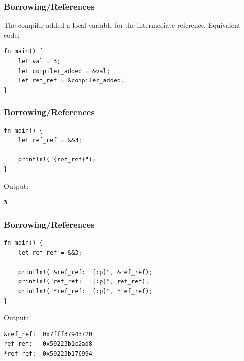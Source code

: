\begin{frame}[fragile]
    \frametitle{Borrowing/References}
    The compiler added a local variable for the intermediate reference.
    Equivalent code:
    \vfill
    \begin{verbatim}
fn main() {
    let val = 3;
    let compiler_added = &val;
    let ref_ref = &compiler_added;
}
    \end{verbatim}
\end{frame}

\begin{frame}[fragile]
    \frametitle{Borrowing/References}
    \begin{verbatim}
fn main() {
    let ref_ref = &&3;

    println!("{ref_ref}");
}
    \end{verbatim}
    \vfill
    Output:
    \pause
    \begin{verbatim}
3
    \end{verbatim}
\end{frame}

\begin{frame}[fragile]
    \frametitle{Borrowing/References}
    \begin{verbatim}
fn main() {
    let ref_ref = &&3;

    println!("&ref_ref:  {:p}", &ref_ref);
    println!("ref_ref:   {:p}", ref_ref);
    println!("*ref_ref:  {:p}", *ref_ref);
}
    \end{verbatim}
    \pause
    \vfill
    Output:
    \begin{verbatim}
&ref_ref:  0x7fff37943720
ref_ref:   0x59223b1c2ad8
*ref_ref:  0x59223b176994
    \end{verbatim}
\end{frame}

